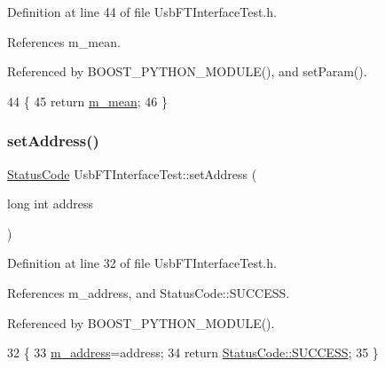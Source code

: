 Definition at line 44 of file Usb\+F\+T\+Interface\+Test.\+h.



References m\+\_\+mean.



Referenced by B\+O\+O\+S\+T\+\_\+\+P\+Y\+T\+H\+O\+N\+\_\+\+M\+O\+D\+U\+L\+E(), and set\+Param().


\begin{DoxyCode}
44                \{
45     \textcolor{keywordflow}{return} \hyperlink{classUsbFTInterfaceTest_a88bd9de98a903663a21e03368aa567fc}{m\_mean};
46   \}
\end{DoxyCode}
\mbox{\label{classUsbFTInterfaceTest_ab9c65d9bc48f205d5dc75e7088474529}} 
\subsubsection{\texorpdfstring{set\+Address()}{setAddress()}}
{\footnotesize\ttfamily \hyperlink{classStatusCode}{Status\+Code} Usb\+F\+T\+Interface\+Test\+::set\+Address (\begin{DoxyParamCaption}\item[{long int}]{address }\end{DoxyParamCaption})\hspace{0.3cm}{\ttfamily [inline]}}



Definition at line 32 of file Usb\+F\+T\+Interface\+Test.\+h.



References m\+\_\+address, and Status\+Code\+::\+S\+U\+C\+C\+E\+SS.



Referenced by B\+O\+O\+S\+T\+\_\+\+P\+Y\+T\+H\+O\+N\+\_\+\+M\+O\+D\+U\+L\+E().


\begin{DoxyCode}
32                                            \{
33     \hyperlink{classUsbFTInterfaceTest_afab3cfd8e2bba2621583f0631471ef12}{m\_address}=address;
34     \textcolor{keywordflow}{return} \hyperlink{classStatusCode_a6f565cbeadc76d14c72f047e5e85eb4badd0da38d3ba0d922efd1f4619bc37ad8}{StatusCode::SUCCESS};
35   \}
\end{DoxyCode}
\mbox{\label{classUsbFTInterfaceTest_a7aec1fc4c65f7079140b69a627f015a3}} 
